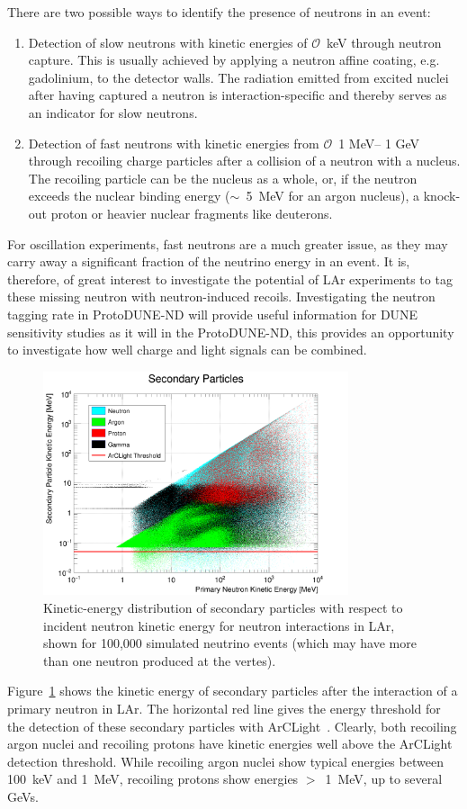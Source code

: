 There are two possible ways to identify the presence of neutrons in an event:
\begin{enumerate}
\item Detection of slow neutrons with kinetic energies of $\mathcal{O}$~keV through neutron capture. This is usually achieved by applying a neutron affine coating, e.g. gadolinium, to the detector walls. The radiation emitted from excited nuclei after having captured a neutron is interaction-specific and thereby serves as an indicator for slow neutrons.
\item Detection of fast neutrons with kinetic energies from $\mathcal{O}$~1 MeV-- 1 GeV through recoiling charge particles after a collision of a neutron with a nucleus. The recoiling particle can be the nucleus as a whole, or, if the neutron exceeds the nuclear binding energy ($\sim$~5~MeV for an argon nucleus), a knock-out proton or heavier nuclear fragments like deuterons.
\end{enumerate}
For oscillation experiments, fast neutrons are a much greater issue, as they may carry away a significant fraction of the neutrino energy in an event. It is, therefore, of great interest to investigate the potential of LAr experiments to tag these missing neutron with neutron-induced recoils. Investigating the neutron tagging rate in ProtoDUNE-ND will provide useful information for DUNE sensitivity studies as it will in the ProtoDUNE-ND, this provides an opportunity to investigate how well charge and light signals can be combined.

\begin{figure}[htbp]
  \centering
  \includegraphics[width=0.8\textwidth]{plots/primary_neutron_recoils.png}
  \caption{Kinetic-energy distribution of secondary particles with respect to incident neutron kinetic energy for neutron interactions in LAr, shown for 100,000 simulated neutrino events (which may have more than one neutron produced at the vertes).}
  \label{fig:neutron_recoils}
\end{figure}
Figure~\ref{fig:neutron_recoils} shows the kinetic energy of secondary particles after the interaction of a primary neutron in LAr. The horizontal red line gives the energy threshold for the detection of these secondary particles with ArCLight~\cite{arclight}. Clearly, both recoiling argon nuclei and recoiling protons have kinetic energies well above the ArCLight detection threshold. While recoiling argon nuclei show typical energies between 100~keV and 1~MeV, recoiling protons show energies $>$~1~MeV, up to several GeVs.

